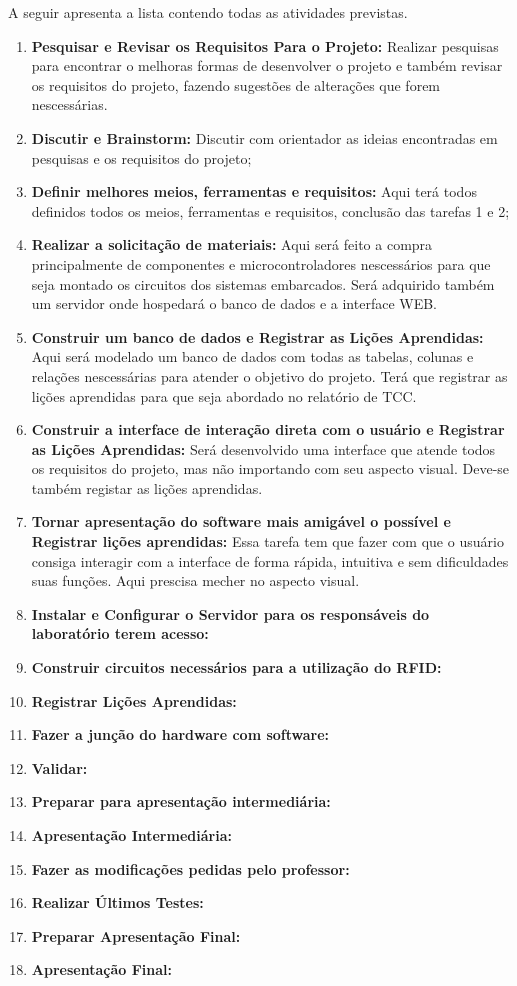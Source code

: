 \vspace{-42pt}

A seguir apresenta a lista contendo todas as atividades previstas.

\begin{enumerate}
	\item \textbf{Pesquisar e Revisar os Requisitos Para o Projeto:} Realizar pesquisas para encontrar o melhoras formas de desenvolver o projeto e também revisar os requisitos do projeto, fazendo sugestões de alterações que forem nescessárias.
	\item  \textbf{Discutir e Brainstorm:} Discutir com orientador as ideias encontradas em pesquisas e os requisitos do projeto;
	\item \textbf{Definir melhores meios, ferramentas e requisitos:} Aqui terá todos definidos todos os meios, ferramentas e requisitos, conclusão das tarefas 1 e 2;
	\item \textbf{Realizar a solicitação de materiais:} Aqui será feito a compra principalmente de componentes e microcontroladores nescessários para que seja montado os circuitos dos sistemas embarcados. Será adquirido também um servidor onde hospedará o banco de dados e a interface WEB.
	\item \textbf{Construir um banco de dados e Registrar as Lições Aprendidas:} Aqui será modelado um banco de dados com todas as tabelas, colunas e relações nescessárias para atender o objetivo do projeto. Terá que registrar as lições aprendidas para que seja abordado no relatório de TCC.
	\item \textbf{Construir a interface de interação direta com o usuário e Registrar as Lições Aprendidas:} Será desenvolvido uma interface que atende todos os requisitos do projeto, mas não importando com seu aspecto visual. Deve-se também registar as lições aprendidas.
	\item \textbf{Tornar apresentação do software mais amigável o possível e Registrar lições aprendidas:} Essa tarefa tem que fazer com que  o usuário consiga interagir com a interface de forma rápida, intuitiva e sem dificuldades suas funções. Aqui prescisa mecher no aspecto visual. 
	\item \textbf{Instalar e Configurar o Servidor para os responsáveis do laboratório terem acesso:}
	\item \textbf{Construir circuitos necessários para a utilização do RFID:}
	\item \textbf{Registrar Lições Aprendidas:}
	\item \textbf{Fazer a junção do hardware com software:}
	\item \textbf{Validar:}
	\item \textbf{Preparar para apresentação intermediária:}
	\item \textbf{Apresentação Intermediária:}
	\item \textbf{Fazer as modificações pedidas pelo professor:}
	\item \textbf{Realizar Últimos Testes:}
	\item \textbf{Preparar Apresentação Final:}
	\item \textbf{Apresentação Final:}
\end{enumerate}

